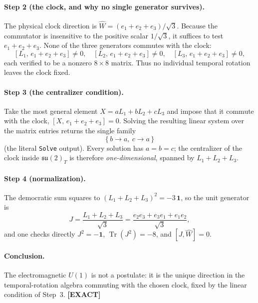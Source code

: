 \documentclass[11pt,oneside]{book}
\newcommand{\Wh}{\hat{W}}                         %
\newcommand{\Tr}{\operatorname{Tr}}
\newcommand{\su}{\mathfrak{su}}
\newcommand{\status}[1]{{\sffamily\bfseries\color{statuscol}[#1]}}
\theoremstyle{plain}
\theoremstyle{definition}
\theoremstyle{remark}
\begin{document}
\paragraph{Step 2 (the clock, and why no single generator survives).}
The physical clock direction is $\Wh=(e_1+e_2+e_3)/\sqrt3$. Because the commutator is
insensitive to the positive scalar $1/\sqrt3$, it suffices to test $e_1+e_2+e_3$. None
of the three generators commutes with the clock:
\[
  [L_1,\,e_1+e_2+e_3]\neq 0,\quad
  [L_2,\,e_1+e_2+e_3]\neq 0,\quad
  [L_3,\,e_1+e_2+e_3]\neq 0 ,
\]
each verified to be a nonzero $8\times8$ matrix. Thus no individual temporal rotation
leaves the clock fixed.

\paragraph{Step 3 (the centralizer condition).}
Take the most general element $X=aL_1+bL_2+cL_3$ and impose that it commute with the
clock, $[X,\,e_1+e_2+e_3]=0$. Solving the resulting linear system over the matrix
entries returns the single family
\[
  \boxed{\;\{\,b\to a,\ c\to a\,\}\;}
\]
(the literal \texttt{Solve} output). Every solution has $a=b=c$; the centralizer of the
clock inside $\su(2)_T$ is therefore \emph{one-dimensional}, spanned by $L_1+L_2+L_3$.

\paragraph{Step 4 (normalization).}
The democratic sum squares to $(L_1+L_2+L_3)^2=-3\,\mathbf 1$, so the unit generator is
\[
  J=\frac{L_1+L_2+L_3}{\sqrt3}=\frac{e_2e_3+e_3e_1+e_1e_2}{\sqrt3},
\]
and one checks directly $J^2=-\mathbf 1$, $\Tr(J^2)=-8$, and $[J,\Wh]=0$.

\paragraph{Conclusion.}
The electromagnetic $U(1)$ is not a postulate: it is the unique direction in the
temporal-rotation algebra commuting with the chosen clock, fixed by the linear
condition of Step~3. \status{EXACT}

\end{document}
